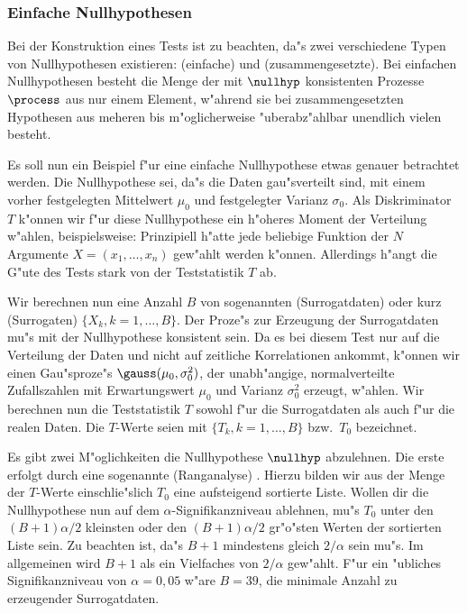 \subsubsection{Einfache Nullhypothesen}
Bei der Konstruktion eines Tests ist zu beachten, da"s zwei verschiedene Typen von
Nullhypothesen existieren: \begriff(einfache) und \begriff(zusammengesetzte). Bei
einfachen Nullhypothesen besteht die Menge der mit $\nullhyp$ konsistenten Prozesse
$\process$ aus nur einem Element, w"ahrend sie bei zusammengesetzten Hypothesen aus
meheren bis m"oglicherweise "uberabz"ahlbar unendlich vielen besteht.

Es soll nun ein Beispiel f"ur eine einfache Nullhypothese etwas genauer betrachtet werden.
Die Nullhypothese sei, da"s die Daten gau"sverteilt sind, mit einem vorher festgelegten
Mittelwert $\mu_0$ und festgelegter Varianz $\sigma_0$. Als Diskriminator $T$
k"onnen wir f"ur diese Nullhypothese ein h"oheres Moment der Verteilung w"ahlen, beispielsweise:
Prinzipiell h"atte jede beliebige Funktion der $N$ Argumente $X=(x_1,\dots,x_n) $ gew"ahlt
werden k"onnen. Allerdings h"angt die G"ute des Tests stark von der Teststatistik $T$
ab\footnotemark.  


Wir berechnen nun eine Anzahl $B$ von sogenannten \begriff(Surrogatdaten) oder kurz
\begriff(Surrogaten) $\{X_k, k=1,\dots,B\}$. Der Proze"s zur Erzeugung der Surrogatdaten
mu"s mit der Nullhypothese konsistent sein. Da es bei diesem Test nur auf die Verteilung
der Daten und nicht auf zeitliche Korrelationen ankommt, k"onnen wir einen Gau"sproze"s
$\gauss(\mu_0,\sigma_0^2)$, der unabh"angige, normalverteilte Zufallszahlen mit
Erwartungswert $\mu_0$ und Varianz $\sigma_0^2$ erzeugt, w"ahlen. Wir berechnen nun die
Teststatistik $T$ sowohl f"ur die Surrogatdaten als auch f"ur die realen Daten. Die
$T$-Werte seien mit $\{T_k,k=1,\dots,B\}$ bzw.\ $T_0$ bezeichnet.

Es gibt zwei M"oglichkeiten die Nullhypothese $\nullhyp$ abzulehnen. Die erste erfolgt
durch eine sogenannte \begriff(Ranganalyse) \cite{Prichard-theiler3}.  Hierzu bilden wir
aus der Menge der $T$-Werte einschlie"slich $T_0$ eine aufsteigend sortierte Liste.
Wollen dir die Nullhypothese nun auf dem $\alpha$-Signifikanzniveau ablehnen, mu"s $T_0$
unter den $(B+1)\alpha/2$ kleinsten oder den $(B+1)\alpha/2$ gr"o"sten Werten der
sortierten Liste sein. Zu beachten ist, da"s $B+1$ mindestens gleich $2/\alpha$ sein mu"s.
Im allgemeinen wird $B+1$ als ein Vielfaches von $2/\alpha$ gew"ahlt. F"ur ein "ubliches
Signifikanzniveau von $\alpha=0,05$ w"are $B=39$, die minimale Anzahl zu erzeugender 
Surrogatdaten.

